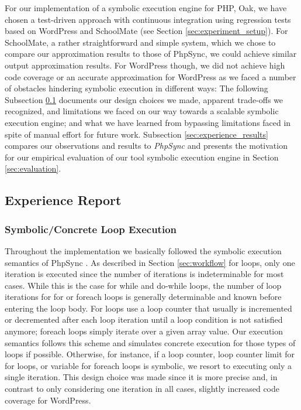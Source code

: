 \documentclass[sigconf]{acmart}
\renewcommand{\sf}[1]{\textsf{#1}}
\begin{document}
For our implementation of a symbolic execution engine for PHP, Oak, we have
chosen a test-driven approach with continuous integration using regression
tests based on \sf{WordPress} and \sf{SchoolMate} (see Section
\ref{sec:experiment_setup}). For \sf{SchoolMate}, a rather straightforward and
simple system, which we chose to compare our approximation results to those of
\sf{PhpSync}, we could achieve similar output approximation results. For
\sf{WordPress} though, we did not achieve high code coverage or an accurate
approximation for \sf{WordPress} as we faced a number of obstacles hindering
symbolic execution in different ways: The following Subsection
\ref{sec:experience_report} documents our design choices we made, apparent trade-offs we recognized, and limitations
we faced on our way towards a scalable symbolic execution engine; and what we
have learned from bypassing limitations faced in spite of manual effort for
future work. Subsection \ref{sec:experience_results} compares our observations
and results to \emph{PhpSync} and presents the motivation for our empirical evaluation of our
tool symbolic execution engine in Section \ref{sec:evaluation}.



\subsection{Experience Report}\label{sec:experience_report}

\subsubsection{Symbolic/Concrete Loop Execution}
Throughout the implementation we basically followed the symbolic execution
semantics of \sf{PhpSync} \cite{Nguyen:2014:BCG:2635868.2635928}. As described
in Section \ref{sec:workflow} for loops, only one iteration is executed since
the number of iterations is indeterminable for most cases. While this is the
case for while and do-while loops, the number of loop iterations for for or
foreach loops is generally determinable and known before entering the loop
body. For loops use a loop counter that usually is incremented or decremented
after each loop iteration until a loop condition is not satisfied anymore;
foreach loops simply iterate over a given array value.
Our execution semantics follows this scheme and simulates concrete execution
for those types of loops if possible. Otherwise, for instance, if a loop
counter, loop counter limit for for loops, or variable for foreach loops is
symbolic, we resort to executing only a single iteration. This design choice
was made since it is more precise and, in contrast to only considering one
iteration in all cases, slightly increased code coverage for \sf{WordPress}.
\end{document}
